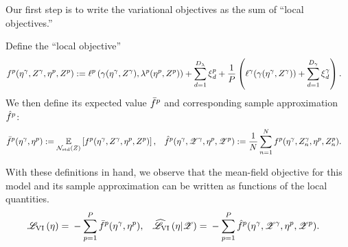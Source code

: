 Our first step is to write the variational objectives as the sum of
``local objectives.''
%
\begin{defn}\label{defn:local_objective}
%
Define the ``local objective''
%
\begin{align*}
%
\f^p(\eta^\gamma, \z^\gamma, \eta^p, \z^p) :={}&
    \ell^p\left(\gamma(\eta^\gamma, \z^\gamma),
                \lambda^p(\eta^p, \z^p)\right) +
    \sum_{d=1}^{\lambdadim} {\etaxi}^p_d +
    \frac{1}{P} \left(
        \ell^\gamma(\gamma(\eta^\gamma, \z^\gamma)) +
            \sum_{d=1}^{\gammadim} {\etaxi}^\gamma_d
    \right).
\end{align*}
%
We then define its expected value $\bar{f}^p$ and corresponding sample
approximation $\hat{f}^p$:
%
\begin{align*}
%
\fbar^p(\eta^\gamma, \eta^p) :={}&
    \expect{\normz}{\f^p(\eta^\gamma, \z^\gamma, \eta^p, \z^p)}, 
&\fhat^p(\eta^\gamma, \Z^\gamma, \eta^p, \Z^p) :={}&
\meann \f^p(\eta^\gamma, \z^\gamma_n, \eta^p, \z^p_n).
%
\end{align*}
%
\end{defn}
With these definitions in hand, we observe that the mean-field objective
for this model and its sample approximation can be written as functions
of the local quantities.
%
\begin{align*}
\klfullobj{\eta} ={}&
    -\sump \fbar^p(\eta^\gamma, \eta^p),
&
\klobj{\eta | \Z} ={}&
    -\sump \fhat^p(\eta^\gamma, \Z^\gamma, \eta^p, \Z^p).
%
\end{align*}
%



